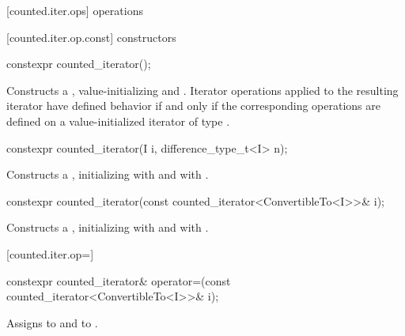 [counted.iter.ops]{ operations}

[counted.iter.op.const]{ constructors}

%
\begin{itemdecl}
constexpr counted_iterator();
\end{itemdecl}

\begin{itemdescr}
\pnum
\effects Constructs a , value-initializing
 and . Iterator operations applied to the
resulting iterator have defined behavior if and only if the corresponding operations
are defined on a value-initialized iterator of type .
\end{itemdescr}

%
\begin{itemdecl}
constexpr counted_iterator(I i, difference_type_t<I> n);
\end{itemdecl}

\begin{itemdescr}
\pnum
\requires {}

\pnum
\effects Constructs a , initializing
 with  and  with .
\end{itemdescr}

%
\begin{itemdecl}
constexpr counted_iterator(const counted_iterator<ConvertibleTo<I>>& i);
\end{itemdecl}

\begin{itemdescr}
\pnum
\effects Constructs a , initializing
 with  and  with .
\end{itemdescr}

[counted.iter.op=]{}

%
%
\begin{itemdecl}
constexpr counted_iterator& operator=(const counted_iterator<ConvertibleTo<I>>& i);
\end{itemdecl}

\begin{itemdescr}
\pnum
\effects Assigns  to
 and  to .

\end{itemdescr}

